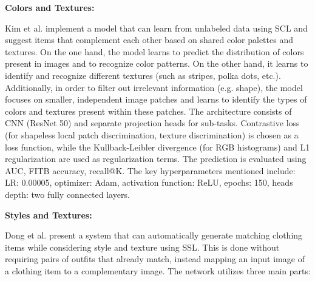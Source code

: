 \textbf{Colors and Textures:}

\vspace{0.5cm}

Kim et al. implement a model that can learn from unlabeled data using \acs{SCL} and suggest items that complement each other based on shared color palettes and textures. On the one hand, the model learns to predict the distribution of colors present in images and to recognize color patterns. On the other hand, it learns to identify and recognize different textures (such as stripes, polka dots, etc.). Additionally, in order to filter out irrelevant information (e.g. shape), the model focuses on smaller, independent image patches and learns to identify the types of colors and textures present within these patches. The architecture consists of \acs{CNN} (\acs{ResNet} 50) and separate projection heads for sub-tasks. Contrastive loss (for shapeless local patch discrimination, texture discrimination) is chosen as a loss function, while the Kullback-Leibler divergence (for RGB histograms) and L1 regularization are used as regularization terms. The prediction is evaluated using \acs{AUC}, \acs{FITB} accuracy, recall@K. The key hyperparameters mentioned include: \acs{LR}: 0.00005, optimizer: Adam, activation function: \acs{ReLU}, epochs: 150, heads depth: two fully connected layers. \cite[cf.]{kim_self-supervised_2020}

\vspace{0.5cm}

\textbf{Styles and Textures:}

\vspace{0.5cm}

Dong et al. present a system that can automatically generate matching clothing items while considering style and texture using \acs{SSL}. This is done without requiring pairs of outfits that already match, instead mapping an input image of a clothing item to a complementary image. The network utilizes three main parts: \cite[cf.]{dong_towards_2025}

